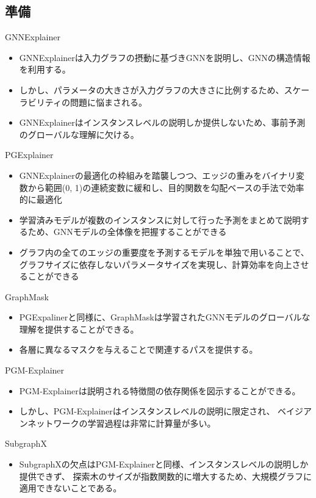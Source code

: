 \documentclass[a4paper,10pt]{ltjsarticle}
\newcommand{\1}{\mbox{1}\hspace{-0.25em}\mbox{l}}
\theoremstyle{definition}
\begin{document}
    \subsection{準備}
    GNNExplainer\cite{ying2019gnnexplainer}
    \begin{itemize}
        \item GNNExplainerは入力グラフの摂動に基づきGNNを説明し、GNNの構造情報を利用する。
        \item しかし、パラメータの大きさが入力グラフの大きさに比例するため、スケーラビリティの問題に悩まされる。
        \item GNNExplainerはインスタンスレベルの説明しか提供しないため、事前予測のグローバルな理解に欠ける。
    \end{itemize}

    PGExplainer\ \cite{luo2020parameterized}
    \begin{itemize}
        \item GNNExplainerの最適化の枠組みを踏襲しつつ、エッジの重みをバイナリ変数から範囲(0, 1)の連続変数に緩和し、目的関数を勾配ベースの手法で効率的に最適化
        \item 学習済みモデルが複数のインスタンスに対して行った予測をまとめて説明するため、GNNモデルの全体像を把握することができる
        \item グラフ内の全てのエッジの重要度を予測するモデルを単独で用いることで、グラフサイズに依存しないパラメータサイズを実現し、計算効率を向上させることができる
    \end{itemize}

    GraphMask\ \cite{schlichtkrull2020interpreting}
    \begin{itemize}
        \item PGExpalinerと同様に、GraphMaskは学習されたGNNモデルのグローバルな理解を提供することができる。
        \item 各層に異なるマスクを与えることで関連するパスを提供する。
    \end{itemize}

    PGM-Explainer\ \cite{vu2020pgm}
    \begin{itemize}
        \item PGM-Explainerは説明される特徴間の依存関係を図示することができる。
        \item しかし、PGM-Explainerはインスタンスレベルの説明に限定され、
        ベイジアンネットワークの学習過程は非常に計算量が多い。
    \end{itemize}
    SubgraphX\ \cite{yuan2021explainability}
    \begin{itemize}
        \item SubgraphXの欠点はPGM-Explainerと同様、インスタンスレベルの説明しか提供できず、
        探索木のサイズが指数関数的に増大するため、大規模グラフに適用できないことである。
    \end{itemize}
\end{document}
